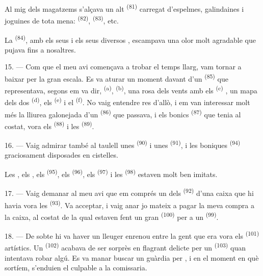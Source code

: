 Al mig dels magatzems s'alçava un alt 
\textsuperscript{(81)} carregat d'espelmes, galindaines i joguines de tota mena:
 \textsuperscript{(82)}, 
\textsuperscript{(83)}, etc.

La  \textsuperscript{(84)}, amb els seus  i
els seus diversos , escampava una olor molt agradable que pujava
fins a nosaltres.

\VUsaut{3.4mm}
\VUsaut{2.8mm}

15. --- Com que el meu avi començava a trobar el temps llarg, vam tornar a baixar
per la gran escala. Es va aturar un moment davant d'un  \textsuperscript{(85)} que representava, segons em va dir,
 \textsuperscript{(a)}, 
\textsuperscript{(b)}, una rosa dels vents amb els 
\textsuperscript{(c)} , un mapa dels dos
 \textsuperscript{(d)}, els 
\textsuperscript{(e)} i el  \textsuperscript{(f)}. No vaig
entendre res d'allò, i em van interessar molt més la lliurea galonejada d'un
 \textsuperscript{(86)} que passava, i els bonics
 \textsuperscript{(87)} que tenia al costat, vora els
 \textsuperscript{(88)} i les 
\textsuperscript{(89)}.

16. --- Vaig admirar també al taulell unes 
\textsuperscript{(90)} i unes  \textsuperscript{(91)},
i les boniques  \textsuperscript{(94)} graciosament
disposades en cistelles.

Les , els , els 
\textsuperscript{(95)}, els  \textsuperscript{(96)}, els
 \textsuperscript{(97)} i les 
\textsuperscript{(98)} estaven molt ben imitats.

\VUsaut{4.4mm}
\VUsaut{2.8mm}

17. --- Vaig demanar al meu avi que em comprés un dels 
\textsuperscript{(92)} d'una caixa que hi havia vora les 
\textsuperscript{(93)}. Va acceptar, i vaig anar jo mateix a pagar la meva compra
a la caixa, al costat de la qual estaven fent un gran 
\textsuperscript{(100)} per a un  \textsuperscript{(99)}.

18. --- De sobte hi va haver un lleuger enrenou entre la gent que era vora els
 \textsuperscript{(101)} artístics. Un 
\textsuperscript{(102)} acabava de ser sorprès en flagrant delicte per un
 \textsuperscript{(103)} quan intentava robar
algú. Es va manar buscar un guàrdia per , i en el moment en
què sortíem, s'enduien el culpable a la comissaria.
\VUsaut{6.0mm}
\VUfilet{22mm}
